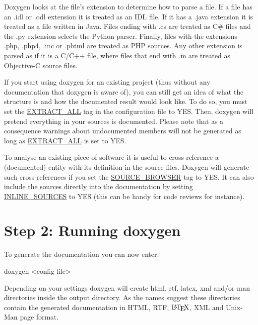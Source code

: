 Doxygen looks at the file's extension to determine how to parse a file. If a file has an {\ttfamily .idl} or {\ttfamily .odl} extension it is treated as an IDL file. If it has a {\ttfamily .java} extension it is treated as a file written in Java. Files ending with {\ttfamily .cs} are treated as C\# files and the {\ttfamily .py} extension selects the Python parser. Finally, files with the extensions {\ttfamily .php}, {\ttfamily .php4}, {\ttfamily .inc} or {\ttfamily .phtml} are treated as PHP sources. Any other extension is parsed as if it is a C/C++ file, where files that end with {\ttfamily .m} are treated as Objective-\/C source files.

\label{starting_extract_all}
\hypertarget{starting_extract_all}{}
 If you start using doxygen for an existing project (thus without any documentation that doxygen is aware of), you can still get an idea of what the structure is and how the documented result would look like. To do so, you must set the \hyperlink{config_cfg_extract_all}{EXTRACT\_\-ALL} tag in the configuration file to {\ttfamily YES}. Then, doxygen will pretend everything in your sources is documented. Please note that as a consequence warnings about undocumented members will not be generated as long as \hyperlink{config_cfg_extract_all}{EXTRACT\_\-ALL} is set to {\ttfamily YES}.

To analyse an existing piece of software it is useful to cross-\/reference a (documented) entity with its definition in the source files. Doxygen will generate such cross-\/references if you set the \hyperlink{config_cfg_source_browser}{SOURCE\_\-BROWSER} tag to {\ttfamily YES}. It can also include the sources directly into the documentation by setting \hyperlink{config_cfg_inline_sources}{INLINE\_\-SOURCES} to {\ttfamily YES} (this can be handy for code reviews for instance).\hypertarget{starting_step2}{}\section{Step 2: Running doxygen}\label{starting_step2}
To generate the documentation you can now enter: \begin{DoxyVerb}
doxygen <config-file>
\end{DoxyVerb}


Depending on your settings doxygen will create {\ttfamily html}, {\ttfamily rtf}, {\ttfamily latex}, {\ttfamily xml} and/or {\ttfamily man} directories inside the output directory. As the names suggest these directories contain the generated documentation in HTML, RTF, $\mbox{\LaTeX}$, XML and Unix-\/Man page format.

